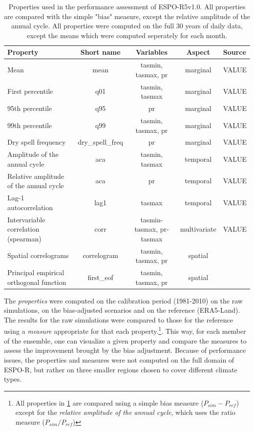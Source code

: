 \documentclass[letterpaper,10pt]{article}
\begin{document}
\begin{table}[!ht]
    \centering
    \caption{Properties used in the performance assessment of ESPO-R5v1.0. All properties are compared with the simple "bias" measure, except the relative amplitude of the annual cycle. All properties were computed on the full 30 years of daily data, except the means which were computed seperately for each month.}
    \begin{tabular}{l|c|c|c|l}
    \hline
    Property                               & Short name & Variables          & Aspect   & Source \\ \hline
    Mean                                   & mean       & tasmin, tasmax, pr & marginal & VALUE \\ \hline
    First percentile                       & q01        & tasmin, tasmax     & marginal & VALUE \\ \hline
    95th percentile                        & q95        & pr                 & marginal & VALUE \\ \hline
    99th percentile                        & q99        & tasmin, tasmax, pr & marginal & VALUE \\ \hline
    Dry spell frequency                    & dry\_spell\_freq & pr           & marginal & VALUE \\ \hline
    Amplitude of the annual cycle          & aca        & tasmin, tasmax     & temporal & VALUE \\ \hline
    Relative amplitude of the annual cycle & aca        & pr                 & temporal & VALUE \\ \hline
    Lag-1 autocorrelation                  & lag1       & tasmax             & temporal & VALUE \\ \hline
    Intervariable correlation (spearman)   & corr       & tasmin-tasmax, pr-tasmax & multivariate & VALUE \\ \hline
    Spatial correlograms                   & correlogram & tasmin, tasmax, pr & spatial & \cite{Francois2020} \\\hline
    Principal empirical orthogonal function& first\_eof & tasmin, tasmax, pr & spatial & \cite{Vrac2018} \\ \hline
    \end{tabular}
    \label{tab:props}

\end{table}

The \emph{properties} were computed on the calibration period (1981-2010) on the raw simulations, on the bias-adjusted scenarios and on the reference (ERA5-Land). The results for the raw simulations were compared to those for the reference using a \emph{measure} appropriate for that each property.\footnote{All properties in \ref{tab:props} are compared using a simple bias measure ($P_{sim} - P_{ref}$) except for the \emph{relative amplitude of the annual cycle}, which uses the ratio measure ($P_{sim} / P_{ref}$)}. This way, for each member of the ensemble, one can visualize a given property and compare the measures to assess the improvement brought by the bias adjustment. Because of performance issues, the properties and measures were not computed on the full domain of ESPO-R, but rather on three smaller regions chosen to cover different climate types.
\end{document}
